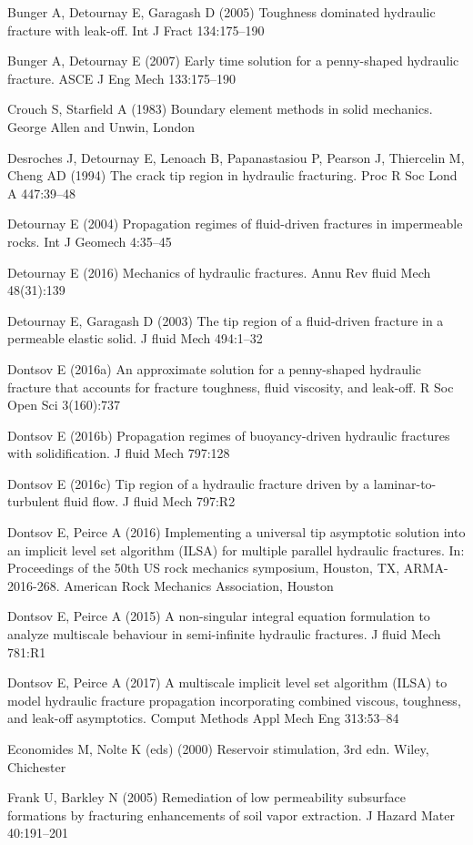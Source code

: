 \documentclass[main.tex]{subfiles}
\begin{document}
Bunger A, Detournay E, Garagash D (2005) Toughness dominated hydraulic fracture with leak-off. Int J Fract 134:175–190

Bunger A, Detournay E (2007) Early time solution for a penny-shaped hydraulic fracture. ASCE J Eng Mech 133:175–190

Crouch S, Starfield A (1983) Boundary element methods in solid mechanics. George Allen and Unwin, London

Desroches J, Detournay E, Lenoach B, Papanastasiou P, Pearson J, Thiercelin M, Cheng AD (1994) The crack tip region in hydraulic fracturing. Proc R Soc Lond A 447:39–48

Detournay E (2004) Propagation regimes of fluid-driven fractures in impermeable rocks. Int J Geomech 4:35–45

Detournay E (2016) Mechanics of hydraulic fractures. Annu Rev fluid Mech 48(31):139

Detournay E, Garagash D (2003) The tip region of a fluid-driven fracture in a permeable elastic solid. J fluid Mech 494:1–32

Dontsov E (2016a) An approximate solution for a penny-shaped hydraulic fracture that accounts for fracture toughness, fluid viscosity, and leak-off. R Soc Open Sci 3(160):737

Dontsov E (2016b) Propagation regimes of buoyancy-driven hydraulic fractures with solidification. J fluid Mech 797:128

Dontsov E (2016c) Tip region of a hydraulic fracture driven by a laminar-to-turbulent fluid flow. J fluid Mech 797:R2

Dontsov E, Peirce A (2016) Implementing a universal tip asymptotic solution into an implicit level set algorithm (ILSA) for multiple parallel hydraulic fractures. In: Proceedings of the 50th US rock mechanics symposium, Houston, TX, ARMA-2016-268. American Rock Mechanics Association, Houston

Dontsov E, Peirce A (2015) A non-singular integral equation formulation to analyze multiscale behaviour in semi-infinite hydraulic fractures. J fluid Mech 781:R1

Dontsov E, Peirce A (2017) A multiscale implicit level set algorithm (ILSA) to model hydraulic fracture propagation incorporating combined viscous, toughness, and leak-off asymptotics. Comput Methods Appl Mech Eng 313:53–84

Economides M, Nolte K (eds) (2000) Reservoir stimulation, 3rd edn. Wiley, Chichester

Frank U, Barkley N (2005) Remediation of low permeability subsurface formations by fracturing enhancements of soil vapor extraction. J Hazard Mater 40:191–201
\end{document}
